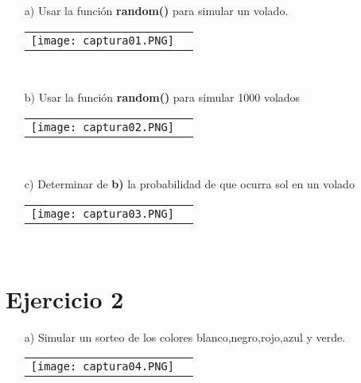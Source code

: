 \documentclass[10pt]{article}\usepackage[]{graphicx}\usepackage[]{color}
\begin{document}
\begin{itemize}
\item[a)]Usar la función \textbf{random()} para simular un volado.\\
\begin{tabular}{p{} p{} }
\texttt{[image: captura01.PNG]}
\end{tabular}\\
\item[b)]Usar la función \textbf{random()} para simular 1000 volados\\
\begin{tabular}{p{} p{} }
\texttt{[image: captura02.PNG]}
\end{tabular}\\
\newpage
\item[c)]Determinar de \textbf{b)} la probabilidad de que ocurra sol en un volado\\
\begin{tabular}{p{} p{} }
\texttt{[image: captura03.PNG]}
\end{tabular}\\
\end{itemize}

\section{Ejercicio 2}
\begin{itemize}
\item[a)]Simular un sorteo de los colores blanco,negro,rojo,azul y verde.\\
\begin{tabular}{p{} p{} }
\texttt{[image: captura04.PNG]}
\end{tabular}\\
\end{itemize}
\end{document}
